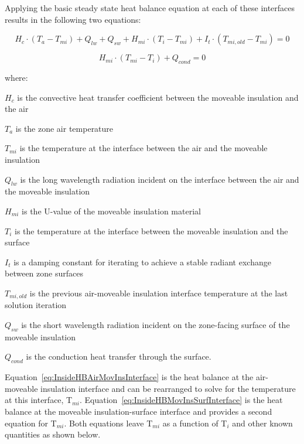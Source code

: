 Applying the basic steady state heat balance equation at each of these interfaces results in the following two equations:

\begin{equation}
H_c \cdot \left( T_a - T_{mi} \right) + Q_{lw} + Q_{sw} + H_{mi} \cdot  \left( T_i - T_{mi} \right) + I_t \cdot  \left( T_{mi,old} - T_{mi} \right) = 0
\label{eq:InsideHBAirMovInsInterface}
\end{equation}

\begin{equation}
H_{mi} \cdot \left( T_{mi} - T_i \right) + Q_{cond} = 0
\label{eq:InsideHBMovInsSurfInterface}
\end{equation}

where:

\(H_c\) is the convective heat transfer coefficient between the moveable insulation and the air

\(T_a\) is the zone air temperature

\(T_{mi}\) is the temperature at the interface between the air and the moveable insulation

\(Q_{lw}\) is the long wavelength radiation incident on the interface between the air and the moveable insulation

\(H_{mi}\) is the U-value of the moveable insulation material

\(T_i\) is the temperature at the interface between the moveable insulation and the surface

\(I_t\) is a damping constant for iterating to achieve a stable radiant exchange between zone surfaces

\(T_{mi,old}\) is the previous air-moveable insulation interface temperature at the last solution iteration

\(Q_{sw}\) is the short wavelength radiation incident on the zone-facing surface of the moveable insulation

\(Q_{cond}\) is the conduction heat transfer through the surface.

Equation~\ref{eq:InsideHBAirMovInsInterface} is the heat balance at the air-moveable insulation interface and can be rearranged to solve for the temperature at this interface, T\(_{mi}\).  Equation~\ref{eq:InsideHBMovInsSurfInterface} is the heat balance at the moveable insulation-surface interface and provides a second equation for T\(_{mi}\).  Both equations leave T\(_{mi}\) as a function of T\(_{i}\) and other known quantities as shown below.

